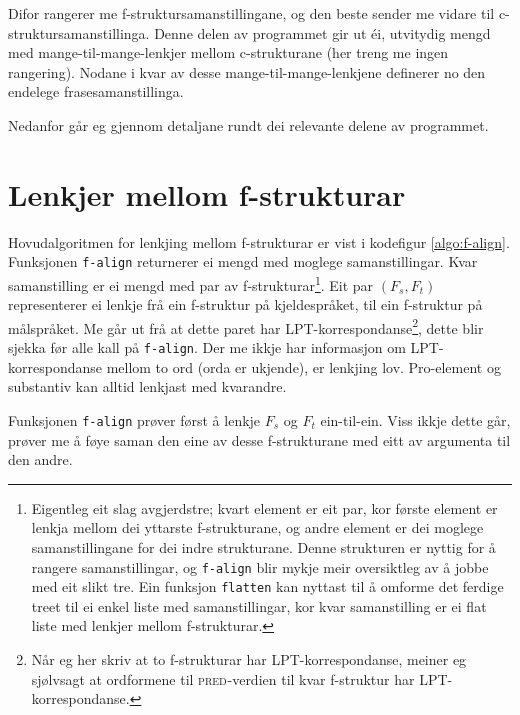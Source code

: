 \documentclass[11pt,a4paper,oneside,draft]{book}
\newcommand{\F}[2]{\textsc{#1}\ensuremath{_{#2}}}
\newcommand{\PRED}{\F{pred}{}}
\begin{document}
Difor rangerer me f-struktursamanstillingane, og den beste sender me
vidare til c-struktursamanstillinga. Denne delen av programmet gir ut
éi, utvitydig mengd med mange-til-mange-lenkjer mellom c-strukturane
(her treng me ingen rangering). Nodane i kvar av desse
mange-til-mange-lenkjene definerer no den endelege
frasesamanstillinga.

Nedanfor går eg gjennom detaljane rundt dei relevante delene av
programmet.

\section{Lenkjer mellom f-strukturar}
\label{sec-4.1}

\label{SEC:impl-f-lenkjing}

Hovudalgoritmen for lenkjing mellom f-strukturar er vist i kodefigur
\ref{algo:f-align}. Funksjonen \texttt{f-align} returnerer ei mengd med
moglege samanstillingar. Kvar samanstilling er ei mengd med par av
f-strukturar\footnote{Eigentleg eit slag avgjerdstre; kvart element er eit par, kor
        første element er lenkja mellom dei yttarste f-strukturane, og
        andre element er dei moglege samanstillingane for dei indre
        strukturane. Denne strukturen er nyttig for å rangere
        samanstillingar, og \texttt{f-align} blir mykje meir oversiktleg av å
        jobbe med eit slikt tre. Ein funksjon \texttt{flatten} kan nyttast
        til å omforme det ferdige treet til ei enkel liste med
        samanstillingar, kor kvar samanstilling er ei flat liste med
        lenkjer mellom f-strukturar. }. Eit par $(F_s,F_t)$ representerer ei lenkje frå
ein f-struktur på kjeldespråket, til ein f-struktur på målspråket. Me
går ut frå at dette paret har LPT-korrespondanse\footnote{Når eg her skriv at to f-strukturar har LPT-korrespondanse,
        meiner eg sjølvsagt at ordformene til \PRED{}-verdien til kvar
        f-struktur har LPT-korrespondanse. }, dette blir
sjekka før alle kall på \texttt{f-align}. Der me ikkje har informasjon om
LPT-korrespondanse mellom to ord (orda er ukjende), er lenkjing
lov. Pro-element og substantiv kan alltid lenkjast med kvarandre.

Funksjonen \texttt{f-align} prøver først å lenkje $F_s$ og $F_t$
ein-til-ein. Viss ikkje dette går, prøver me å føye saman den eine av
desse f-strukturane med eitt av argumenta til den andre. 
\end{document}
